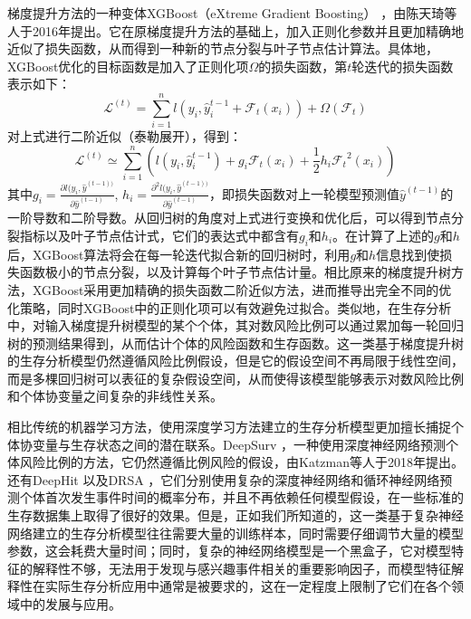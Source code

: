 梯度提升方法的一种变体XGBoost（eXtreme Gradient Boosting） ，由陈天琦等人于2016年提出。它在原梯度提升方法的基础上，加入正则化参数并且更加精确地近似了损失函数，从而得到一种新的节点分裂与叶子节点估计算法。具体地，XGBoost优化的目标函数是加入了正则化项$\Omega$的损失函数，第$t$轮迭代的损失函数表示如下： 
\begin{equation}
\mathcal{L}^{(t)} = \sum_{i=1}^n l(y_i, \hat{y}_i^{t-1} + \mathcal{F}_t(x_i)) + \Omega(\mathcal{F}_t) \label{F11}
\end{equation}
对上式进行二阶近似（泰勒展开），得到： 
\begin{equation}
\mathcal{L}^{(t)} \simeq \sum_{i=1}^n \left( l(y_i, \hat{y}_i^{t-1})+g_i\mathcal{F}_t(x_i)+\frac{1}{2} h_i {\mathcal{F}_t}^2 (x_i) \right) \label{F12}
\end{equation}
其中$g_i=\frac{\partial l(y_i, \hat{y}^{(t-1))}}{\partial \hat{y}^{(t-1)}}$, $h_i=\frac{\partial^2 l(y_i, \hat{y}^{(t-1))}}{\partial \hat{y}^{(t-1)}}$，即损失函数对上一轮模型预测值$\hat{y}^{(t-1)}$的一阶导数和二阶导数。从回归树的角度对上式进行变换和优化后，可以得到节点分裂指标以及叶子节点估计式，它们的表达式中都含有$g_i$和$h_i$。在计算了上述的$g$和$h$后，XGBoost算法将会在每一轮迭代拟合新的回归树时，利用$g$和$h$信息找到使损失函数极小的节点分裂，以及计算每个叶子节点估计量。相比原来的梯度提升树方法，XGBoost采用更加精确的损失函数二阶近似方法，进而推导出完全不同的优化策略，同时XGBoost中的正则化项可以有效避免过拟合。类似地，在生存分析中，对输入梯度提升树模型的某个个体，其对数风险比例可以通过累加每一轮回归树的预测结果得到，从而估计个体的风险函数和生存函数。这一类基于梯度提升树的生存分析模型仍然遵循风险比例假设，但是它的假设空间不再局限于线性空间，而是多棵回归树可以表征的复杂假设空间，从而使得该模型能够表示对数风险比例和个体协变量之间复杂的非线性关系。

相比传统的机器学习方法，使用深度学习方法建立的生存分析模型更加擅长捕捉个体协变量与生存状态之间的潜在联系。DeepSurv ，一种使用深度神经网络预测个体风险比例的方法，它仍然遵循比例风险的假设，由Katzman等人于2018年提出。还有DeepHit 以及DRSA ，它们分别使用复杂的深度神经网络和循环神经网络预测个体首次发生事件时间的概率分布，并且不再依赖任何模型假设，在一些标准的生存数据集上取得了很好的效果。但是，正如我们所知道的，这一类基于复杂神经网络建立的生存分析模型往往需要大量的训练样本，同时需要仔细调节大量的模型参数，这会耗费大量时间；同时，复杂的神经网络模型是一个黑盒子，它对模型特征的解释性不够，无法用于发现与感兴趣事件相关的重要影响因子，而模型特征解释性在实际生存分析应用中通常是被要求的，这在一定程度上限制了它们在各个领域中的发展与应用。

